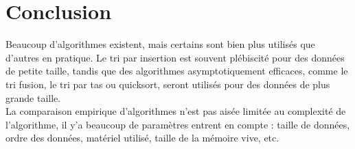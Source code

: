 \chapter{Conclusion}
Beaucoup d'algorithmes existent, mais certains sont bien plus utilisés que d'autres en pratique. Le tri par insertion est souvent plébiscité pour des données de petite taille, tandis que des algorithmes asymptotiquement efficaces, comme le tri fusion, le tri par tas ou quicksort, seront utilisés pour des données de plus grande taille.
\\
La comparaison empirique d'algorithmes n'est pas aisée limitée au complexité de l'algorithme, il y'a beaucoup de paramètres entrent en compte : taille de données, ordre des données, matériel utilisé, taille de la mémoire vive, etc. 
